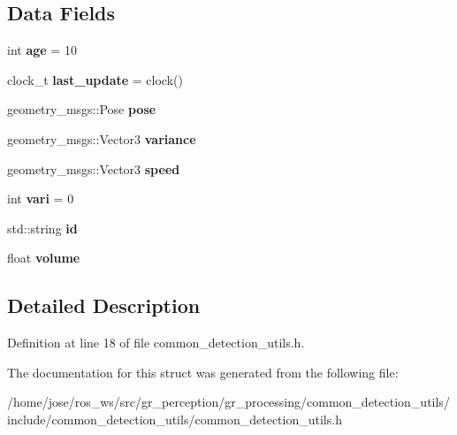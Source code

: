 \subsection*{Data Fields}
\begin{DoxyCompactItemize}
\item 
\mbox{\label{structgr__detection_1_1Person_a08c0366a827671c951446a4ebc0c9152}} 
int {\bfseries age} = 10
\item 
\mbox{\label{structgr__detection_1_1Person_aee45c6e9037043579f8511175d153c3c}} 
clock\+\_\+t {\bfseries last\+\_\+update} = clock()
\item 
\mbox{\label{structgr__detection_1_1Person_ab7c22d199d7a5dc7a8577fa80926bb55}} 
geometry\+\_\+msgs\+::\+Pose {\bfseries pose}
\item 
\mbox{\label{structgr__detection_1_1Person_afec83264488035939e0059c516d7adc3}} 
geometry\+\_\+msgs\+::\+Vector3 {\bfseries variance}
\item 
\mbox{\label{structgr__detection_1_1Person_ad0e0ffc32c16ce602ab844fda2c9d2e2}} 
geometry\+\_\+msgs\+::\+Vector3 {\bfseries speed}
\item 
\mbox{\label{structgr__detection_1_1Person_ad233cc7676fa6145e6d6b6ea8fc48e95}} 
int {\bfseries vari} = 0
\item 
\mbox{\label{structgr__detection_1_1Person_a2b5ada4a5233809d7fa27976f87dd703}} 
std\+::string {\bfseries id}
\item 
\mbox{\label{structgr__detection_1_1Person_ae7b6bcb75de589a3c546f4142e071eb7}} 
float {\bfseries volume}
\end{DoxyCompactItemize}


\subsection{Detailed Description}


Definition at line 18 of file common\+\_\+detection\+\_\+utils.\+h.



The documentation for this struct was generated from the following file\+:\begin{DoxyCompactItemize}
\item 
/home/jose/ros\+\_\+ws/src/gr\+\_\+perception/gr\+\_\+processing/common\+\_\+detection\+\_\+utils/include/common\+\_\+detection\+\_\+utils/common\+\_\+detection\+\_\+utils.\+h\end{DoxyCompactItemize}
